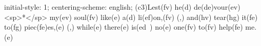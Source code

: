 initial-style: 1;
centering-scheme: english;
(c3)Lest(fv) he(d) de(de)vour(ev) <sp>*</sp> my(ev) soul(fv) like(e) a(d) li(ef)on,(fv) (,) and(hv) tear(hg) it(fe) to(fg) piec(fe)es,(e) (,) while(e) there(e) is(ed~) no(e) one(fv) to(fv) help(fe) me.(e)